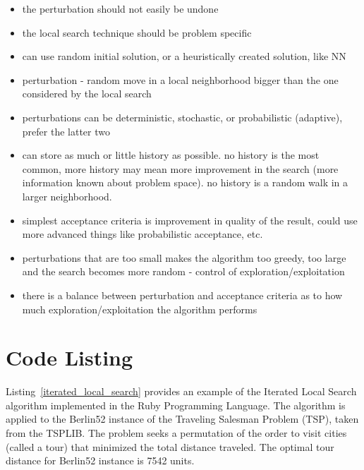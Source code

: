\documentclass[a4paper, 11pt]{article}
\begin{document}
\begin{itemize}
	\item the perturbation should not easily be undone
	\item the local search technique should be problem specific
	\item can use random initial solution, or a heuristically created solution, like NN
	\item perturbation - random move in a local neighborhood bigger than the one considered by the local search
	\item perturbations can be deterministic, stochastic, or probabilistic (adaptive), prefer the latter two
	\item can store as much or little history as possible. no history is the most common, more history may mean more improvement in the search (more information known about problem space). no history is a random walk in a larger neighborhood.
	\item simplest acceptance criteria is improvement in quality of the result, could use more advanced things like probabilistic acceptance, etc.
	\item perturbations that are too small makes the algorithm too greedy, too large and the search becomes more random - control of exploration/exploitation
	\item there is a balance between perturbation and acceptance criteria as to how much exploration/exploitation the algorithm performs
\end{itemize}

\section{Code Listing}
\label{sec:code}
Listing~\ref{iterated_local_search} provides an example of the Iterated Local Search algorithm implemented in the Ruby Programming Language. 
The algorithm is applied to the Berlin52 instance of the Traveling Salesman Problem (TSP), taken from the TSPLIB. The problem seeks a permutation of the order to visit cities (called a tour) that minimized the total distance traveled. The optimal tour distance for Berlin52 instance is 7542 units.
\end{document}
